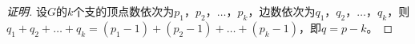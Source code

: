 \begin{proof}[证明]设$G$的$k$个支的顶点数依次为$p_1$，$p_2$，$\ldots$，$p_k$，边数依次为$q_1$，$q_2$，$\ldots$，$q_k$，则$q_1+q_2+\ldots + q_k=(p_1 - 1)+(p_2 - 1) +\ldots + (p_k - 1)$，即$q=p-k$。
\end{proof}
